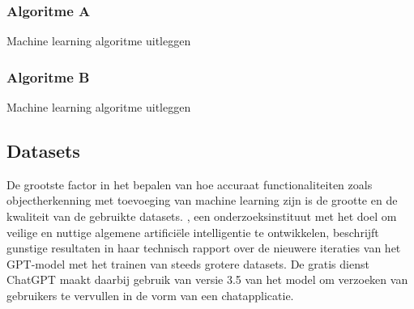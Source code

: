 \subsubsection{Algoritme A}
Machine learning algoritme uitleggen

\subsubsection{Algoritme B}
Machine learning algoritme uitleggen

\subsection{Datasets}
\label{subsec:datasets}
De grootste factor in het bepalen van hoe accuraat functionaliteiten zoals objectherkenning met toevoeging van machine learning zijn is de grootte en de kwaliteit van de gebruikte datasets.
\textcite{OpenAI2023}, een onderzoeksinstituut met het doel om veilige en nuttige algemene artifici\"ele intelligentie te ontwikkelen, beschrijft gunstige resultaten in haar technisch rapport over de nieuwere iteraties van het GPT-model met het trainen van steeds grotere datasets.
De gratis dienst ChatGPT maakt daarbij gebruik van versie 3.5 van het model om verzoeken van gebruikers te vervullen in de vorm van een chatapplicatie.


